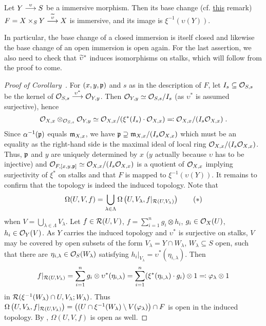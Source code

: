 \documentclass[a4paper,parskip=half,numbers=enddot, DIV=12]{scrreprt}
\begin{document}
\begin{cor}
    Let $Y\morphism[\upsilon]S$ be a immersive morphism. Then its base change (cf. \hyperref[rem:baseChange]{this} remark) $F=X\times_SY\morphism[\snake \upsilon] X$ is immersive, and its image is $\xi^{-1}(\upsilon(Y))$.
\end{cor}
\begin{rem*}
	 In particular, the base change of a closed immersion is itself closed and likewise the base change of an open immersion is open again. For the last assertion, we also need to check that $\snake{\upsilon}^*$ induces isomorphisms on stalks, which will follow from the proof to come.
\end{rem*}
\begin{proof}[Proof of Corollary~]
    For $(x,y,\mathfrak{p})$ and $s$ as in the description of $F$, let $I_s\subseteq \mathcal{O}_{S,s}$ be the kernel of $\Oo_{S,s}\morphism[\upsilon^*] \Oo_{Y,y}$. Then $\mathcal{O}_{Y,y}\simeq \mathcal{O}_{S,s}/I_s$ (as $\upsilon^*$ is assumed surjective), hence 
    \begin{align*}
    	\mathcal{O}_{X,x}\otimes_{\mathcal{O}_{S,s}}\mathcal{O}_{Y,y} \simeq \mathcal{O}_{X,x}/(\xi^*(I_s) \cdot \mathcal{O}_{X,x}) \eqqcolon \mathcal{O}_{X,x}/(I_s\mathcal{O}_{X,x})\;. 
    \end{align*}
    Since $\alpha^{-1}(\mathfrak{p})$ equals $\mathfrak{m}_{X,x}$, we have $\mathfrak{p}\supseteq \mathfrak{m}_{X,x}/(I_s \mathcal{O}_{X,x})$ which must be an equality as the right-hand side is the maximal ideal of local ring $\mathcal{O}_{X,x}/(I_s \mathcal{O}_{X,x})$. Thus, $\mathfrak{p}$ and $y$ are uniquely determined by $x$ ($y$ actually because $\upsilon$ has to be injective) and $\mathcal{O}_{F,[x,y,\mathfrak{p}]}\simeq \mathcal{O}_{X,x}/(I_s \mathcal{O}_{X,x})$ is a quotient of $\mathcal{O}_{X,x}$ implying surjectivity of $\xi^*$ on stalks and that $F$ is mapped to $\xi^{-1}(\upsilon(Y))$. It remains to confirm that the topology is indeed the induced topology. Note that
    \begin{align}\lbl{eq:omegaCover}
        \Omega(U,V,f) = \bigcup_{\lambda\in \Lambda} \Omega\left(U,V_\lambda, f|_{\Rr(U,V_\lambda)}\right)\tag{$*$}
    \end{align}
    when $V=\bigcup_{\lambda\in \Lambda} V_\lambda$. Let $f\in \mathcal{R}(U,V)$, $f=\sum_{i=1}^n g_i\otimes h_i$, $g_i\in \mathcal{O}_X(U)$, $h_i\in\mathcal{O}_Y(V)$. As $Y$ carries the induced topology and $\upsilon^*$ is surjective on stalks, $V$ may be covered by open subsets of the form $V_\lambda = Y\cap W_\lambda$, $W_\lambda \subseteq S$ open, such that there are $\eta_{i,\lambda}\in \mathcal{O}_S(W_\lambda)$ satisfying $h_i|_{V_\lambda} = \upsilon^*(\eta_{i,\lambda})$. Then
    \begin{align*}
        f|_{\mathcal{R}(U,V_\lambda)} = \sum_{i=1}^n g_i\otimes \upsilon^*(\eta_{i,\lambda}) = \sum_{i=1}^n (\xi^*(\eta_{i,\lambda})\cdot g_i) \otimes 1 \eqqcolon\varphi_\lambda\otimes 1
    \end{align*}
    in $\mathcal{R}(\xi^{-1}(W_\lambda)\cap U, V_\lambda; W_\lambda)$. Thus $\Omega\left(U,V_\lambda, f|_{\mathcal{R}(U,V_\lambda)}\right) = \big((U\cap \xi^{-1}(W_\lambda)\setminus V(\varphi_\lambda)\big)\cap F$ is open in the induced topology. By , $\Omega(U,V,f)$ is open as well.
\end{proof}
\end{document}
